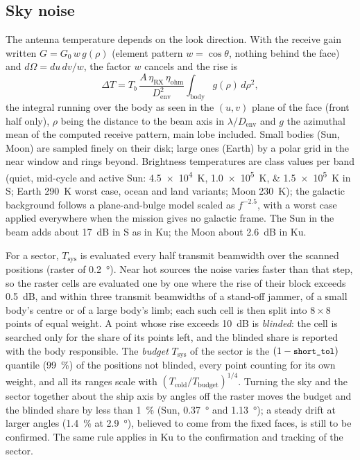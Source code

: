 \documentclass[11pt,a4paper]{article}
\newcommand{\code}[1]{\texttt{\small #1}}
\newcommand{\Tsys}{T_{\mathrm{sys}}}
\newcommand{\Denv}{D_{\mathrm{env}}}
\begin{document}
\subsection{Sky noise}\label{sec:sky}
The antenna temperature depends on the look direction. With the receive gain written $G = G_0\,w\,g(\rho)$ (element
pattern $w=\cos\theta$, nothing behind the face) and $d\Omega = du\,dv/w$, the factor $w$ cancels and the rise is
\[
  \Delta T = T_b\,\frac{A\,\eta_{\mathrm{RX}}\,\eta_{\mathrm{ohm}}}{\Denv^2}\int_{\text{body}} g(\rho)\,d\rho^2,
\]
the integral running over the body as seen in the $(u,v)$ plane of the face (front half only), $\rho$ being the
distance to the beam axis in $\lambda/\Denv$ and $g$ the azimuthal mean of the computed receive pattern, main lobe
included. Small bodies (Sun, Moon) are sampled finely on their disk; large
ones (Earth) by a polar grid in the near window and rings beyond. Brightness temperatures are class values per band
(quiet, mid-cycle and active Sun: \SIlist{4.5e4;1.0e5;1.5e5}{K} in S; Earth \SI{290}{K} worst case, ocean and land
variants; Moon \SI{230}{K}); the galactic background follows a plane-and-bulge model scaled as $f^{-2.5}$, with a
worst case applied everywhere when the mission gives no galactic frame. The Sun in the beam adds about
\SI{17}{dB} in S as in Ku; the Moon about \SI{2.6}{dB} in Ku.

For a sector, $\Tsys$ is evaluated every half transmit beamwidth over the scanned positions (raster of
\SI{0.2}{\degree}). Near hot sources the noise varies faster than that step, so the raster cells are evaluated one by
one where the rise of their block exceeds \SI{0.5}{dB}, and within three transmit beamwidths of a stand-off jammer,
of a small body's centre or of a large body's limb; each such cell is then split into $8\times8$ points of equal
weight. A point whose rise exceeds \SI{10}{dB} is \emph{blinded}: the cell is searched only for the share of its
points left, and the blinded share is reported with the body responsible. The \emph{budget} $\Tsys$ of the sector is
the $(1-\text{\code{short\_tol}})$ quantile (\SI{99}{\percent}) of the positions not blinded, every point counting
for its own weight, and all its ranges scale with $(T_{\mathrm{cold}}/T_{\mathrm{budget}})^{1/4}$. Turning the sky and
the sector together about the ship axis by angles off the raster moves the budget and the blinded share by less than
\SI{1}{\percent} (Sun, \SI{0.37}{\degree} and \SI{1.13}{\degree}); a steady drift at larger angles (\SI{1.4}{\percent}
at \SI{2.9}{\degree}), believed to come from the fixed faces, is still to be confirmed. The same rule applies in Ku to
the confirmation and tracking of the sector.
\end{document}
